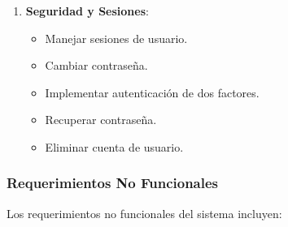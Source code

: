 \begin{enumerate}
    \item \textbf{Seguridad y Sesiones}:
    \begin{itemize}
        \item Manejar sesiones de usuario.
        \item Cambiar contraseña.
        \item Implementar autenticación de dos factores.
        \item Recuperar contraseña.
        \item Eliminar cuenta de usuario.
    \end{itemize}
\end{enumerate}

\subsubsection{Requerimientos No Funcionales}
Los requerimientos no funcionales del sistema incluyen:

